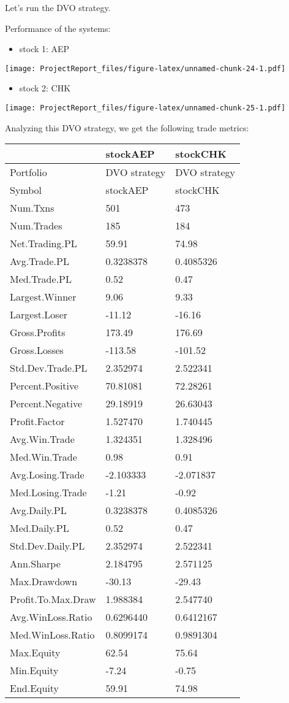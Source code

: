 \documentclass[12pt,]{article}
\providecommand{\tightlist}{%
  \setlength{\itemsep}{0pt}\setlength{\parskip}{0pt}}
\begin{document}
Let's run the DVO strategy.

Performance of the systems:

\begin{itemize}
\tightlist
\item
  stock 1: AEP
\end{itemize}

\texttt{[image: ProjectReport\_files/figure-latex/unnamed-chunk-24-1.pdf]}

\begin{itemize}
\tightlist
\item
  stock 2: CHK
\end{itemize}

\texttt{[image: ProjectReport\_files/figure-latex/unnamed-chunk-25-1.pdf]}

Analyzing this DVO strategy, we get the following trade metrics:

\begin{longtable}[]{@{}lll@{}}
\toprule
& stockAEP & stockCHK\tabularnewline
\midrule
\endhead
Portfolio & DVO strategy & DVO strategy\tabularnewline
Symbol & stockAEP & stockCHK\tabularnewline
Num.Txns & 501 & 473\tabularnewline
Num.Trades & 185 & 184\tabularnewline
Net.Trading.PL & 59.91 & 74.98\tabularnewline
Avg.Trade.PL & 0.3238378 & 0.4085326\tabularnewline
Med.Trade.PL & 0.52 & 0.47\tabularnewline
Largest.Winner & 9.06 & 9.33\tabularnewline
Largest.Loser & -11.12 & -16.16\tabularnewline
Gross.Profits & 173.49 & 176.69\tabularnewline
Gross.Losses & -113.58 & -101.52\tabularnewline
Std.Dev.Trade.PL & 2.352974 & 2.522341\tabularnewline
Percent.Positive & 70.81081 & 72.28261\tabularnewline
Percent.Negative & 29.18919 & 26.63043\tabularnewline
Profit.Factor & 1.527470 & 1.740445\tabularnewline
Avg.Win.Trade & 1.324351 & 1.328496\tabularnewline
Med.Win.Trade & 0.98 & 0.91\tabularnewline
Avg.Losing.Trade & -2.103333 & -2.071837\tabularnewline
Med.Losing.Trade & -1.21 & -0.92\tabularnewline
Avg.Daily.PL & 0.3238378 & 0.4085326\tabularnewline
Med.Daily.PL & 0.52 & 0.47\tabularnewline
Std.Dev.Daily.PL & 2.352974 & 2.522341\tabularnewline
Ann.Sharpe & 2.184795 & 2.571125\tabularnewline
Max.Drawdown & -30.13 & -29.43\tabularnewline
Profit.To.Max.Draw & 1.988384 & 2.547740\tabularnewline
Avg.WinLoss.Ratio & 0.6296440 & 0.6412167\tabularnewline
Med.WinLoss.Ratio & 0.8099174 & 0.9891304\tabularnewline
Max.Equity & 62.54 & 75.64\tabularnewline
Min.Equity & -7.24 & -0.75\tabularnewline
End.Equity & 59.91 & 74.98\tabularnewline
\bottomrule
\end{longtable}
\end{document}
